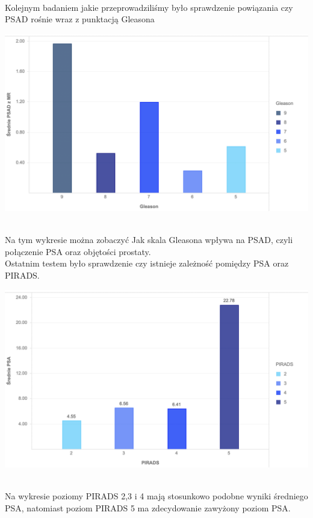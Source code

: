 \documentclass[a4paper,11pt,twoside]{report}
\theoremstyle{definition}
\begin{document}
\\
Kolejnym badaniem jakie przeprowadziliśmy było sprawdzenie powiązania czy PSAD rośnie wraz z punktacją Gleasona
\\
\begin{minipage}{\linewidth}
	\centering
	\includegraphics[width=\textwidth]{Wykresy/PSADGleason.png}
\end{minipage}
\\
Na tym wykresie można zobaczyć Jak skala Gleasona wpływa na PSAD, czyli połączenie PSA oraz objętości prostaty. 
\\
Ostatnim testem było sprawdzenie czy istnieje zależność pomiędzy PSA oraz PIRADS.
\\
\begin{minipage}{\linewidth}
	\centering
	\includegraphics[width=\textwidth]{Wykresy/PIRADSPSA.png}
\end{minipage}
\\
Na wykresie poziomy PIRADS 2,3 i 4 mają stosunkowo podobne wyniki średniego PSA, natomiast poziom PIRADS 5 ma zdecydowanie zawyżony poziom PSA. 
\end{document}
